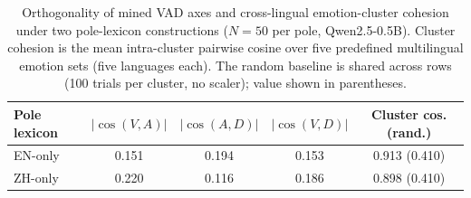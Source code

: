 \begin{table}[t]
\caption{Orthogonality of mined VAD axes and cross-lingual emotion-cluster cohesion under two pole-lexicon constructions ($N{=}50$ per pole, Qwen2.5-0.5B). Cluster cohesion is the mean intra-cluster pairwise cosine over five predefined multilingual emotion sets (five languages each). The random baseline is shared across rows (100 trials per cluster, no scaler); value shown in parentheses.}
\label{tab:e3_axis_cluster}
\centering
\begin{tabular}{lcccc}
\toprule
Pole lexicon & $|\cos(V,A)|$ & $|\cos(A,D)|$ & $|\cos(V,D)|$ & Cluster cos. (rand.) \\
\midrule
EN-only & 0.151 & 0.194 & 0.153 & 0.913 (0.410) \\
ZH-only & 0.220 & 0.116 & 0.186 & 0.898 (0.410) \\
\bottomrule
\end{tabular}
\end{table}
